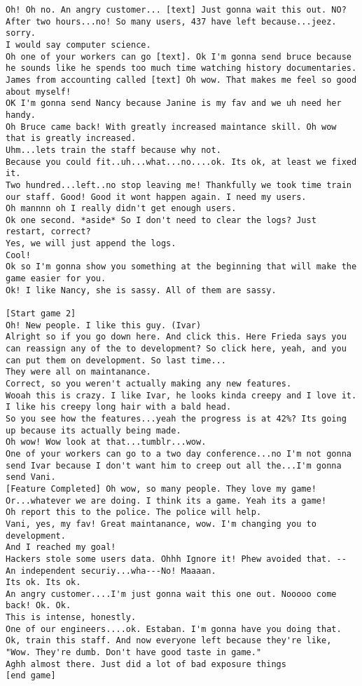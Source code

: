 \begin{lstlisting}
Oh! Oh no. An angry customer... [text] Just gonna wait this out. NO? After two hours...no! So many users, 437 have left because...jeez. sorry. 
I would say computer science. 
Oh one of your workers can go [text]. Ok I'm gonna send bruce because he sounds like he spends too much time watching history documentaries.
James from accounting called [text] Oh wow. That makes me feel so good about myself!
OK I'm gonna send Nancy because Janine is my fav and we uh need her handy.
Oh Bruce came back! With greatly increased maintance skill. Oh wow that is greatly increased.
Uhm...lets train the staff because why not.
Because you could fit..uh...what...no....ok. Its ok, at least we fixed it.
Two hundred...left..no stop leaving me! Thankfully we took time train our staff. Good! Good it wont happen again. I need my users.
Oh mannnn oh I really didn't get enough users.
Ok one second. *aside* So I don't need to clear the logs? Just restart, correct?
Yes, we will just append the logs.
Cool!
Ok so I'm gonna show you something at the beginning that will make the game easier for you.
Ok! I like Nancy, she is sassy. All of them are sassy.

[Start game 2]
Oh! New people. I like this guy. (Ivar)
Alright so if you go down here. And click this. Here Frieda says you can reassign any of the to development? So click here, yeah, and you can put them on development. So last time...
They were all on maintanance.
Correct, so you weren't actually making any new features.
Wooah this is crazy. I like Ivar, he looks kinda creepy and I love it. I like his creepy long hair with a bald head.
So you see how the features...yeah the progress is at 42%? Its going up because its actually being made.
Oh wow! Wow look at that...tumblr...wow.
One of your workers can go to a two day conference...no I'm not gonna send Ivar because I don't want him to creep out all the...I'm gonna send Vani.
[Feature Completed] Oh wow, so many people. They love my game! Or...whatever we are doing. I think its a game. Yeah its a game!
Oh report this to the police. The police will help.
Vani, yes, my fav! Great maintanance, wow. I'm changing you to development.
And I reached my goal!
Hackers stole some users data. Ohhh Ignore it! Phew avoided that. -- An independent securiy...wha---No! Maaaan.
Its ok. Its ok.
An angry customer....I'm just gonna wait this one out. Nooooo come back! Ok. Ok.
This is intense, honestly.
One of our engineers....ok. Estaban. I'm gonna have you doing that.
Ok, train this staff. And now everyone left because they're like, "Wow. They're dumb. Don't have good taste in game."
Aghh almost there. Just did a lot of bad exposure things
[end game]


\end{lstlisting}
